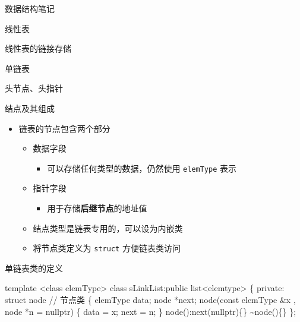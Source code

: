 \documentclass[
  ignorenonframetext,
]{beamer}
\newenvironment{Shaded}{}{}
\newcommand{\NormalTok}[1]{#1}
\providecommand{\tightlist}{%
  \setlength{\itemsep}{0pt}\setlength{\parskip}{0pt}}
\begin{document}
\begin{frame}[fragile]{数据结构笔记}
\begin{block}{线性表}
\begin{block}{线性表的链接存储}
\begin{block}{单链表}
\begin{block}{头节点、头指针}
\end{block}

\begin{block}{结点及其组成}
\protect{}\label{ux7ed3ux70b9ux53caux5176ux7ec4ux6210}
\begin{itemize}
\tightlist
\item
  链表的节点包含两个部分

  \begin{itemize}
  \tightlist
  \item
    数据字段

    \begin{itemize}
    \tightlist
    \item
      可以存储任何类型的数据，仍然使用 \texttt{elemType} 表示
    \end{itemize}
  \item
    指针字段

    \begin{itemize}
    \tightlist
    \item
      用于存储\textbf{后继节点}的地址值
    \end{itemize}
  \item
    结点类型是链表专用的，可以设为内嵌类
  \item
    将节点类定义为 \texttt{struct} 方便链表类访问
  \end{itemize}
\end{itemize}
\end{block}

\begin{block}{单链表类的定义}
\protect{}\label{ux5355ux94feux8868ux7c7bux7684ux5b9aux4e49}
\begin{Shaded}
\begin{Highlighting}[]
\NormalTok{template \textless{}class elemType\textgreater{}}
\NormalTok{class sLinkList:public list\textless{}elemtype\textgreater{}}
\NormalTok{\{}
\NormalTok{  private:}
\NormalTok{    struct node                                    // 节点类}
\NormalTok{    \{}
\NormalTok{      elemType data;}
\NormalTok{      node *next;}
\NormalTok{      node(const elemType \&x , node *n = nullptr)}
\NormalTok{      \{}
\NormalTok{        data = x;}
\NormalTok{        next = n;}
\NormalTok{      \}}
\NormalTok{      node():next(nullptr)\{\}}
\NormalTok{      \textasciitilde{}node()\{\}}
\NormalTok{    \};}


\end{Highlighting}
\end{Shaded}
\end{block}
\end{block}
\end{block}
\end{block}
\end{frame}
\end{document}
